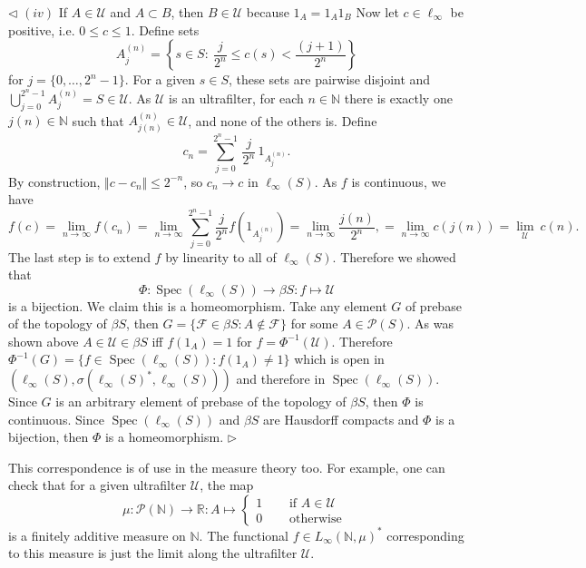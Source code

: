 \documentclass[12pt]{article}
\newenvironment{proof}{\par $\triangleleft$}{$\triangleright$}
\begin{document}
\begin{proof}
    $(iv)$ If $A\in\mathcal U$ and $A\subset B$, then $B\in\mathcal U$ because
    $1_A=1_A 1_B$
    \newline
    Now let $c\in\ell_\infty$ be positive, i.e. $0\leq c\leq 1$. Define sets
    $$
        A_j^{(n)}=\left \{s\in S:
        \ \frac{j}{2^n}\leq c(s)<\frac{(j+1)}{2^n}\right \}
    $$
    for $j=\{0,\ldots,2^n-1\}$. For a given $s\in S$, these sets are pairwise
    disjoint and $\bigcup_{j=0}^{2^n-1}A_j^{(n)}=S\in\mathcal{U}$. As
    $\mathcal{U}$ is an ultrafilter, for each $n\in\mathbb{N}$ there is exactly
    one $j(n)\in\mathbb{N}$ such that $A_{j(n)}^{(n)}\in\mathcal U$, and none of
    the others is. Define
    $$
        c_n=\sum_{j=0}^{2^n-1}\,\frac{j}{2^n}\,1_{A_j^{(n)}}.
    $$
    By construction, $\Vert c-c_n\Vert\leq 2^{-n}$, so $c_n\to c$ in
    $\ell_\infty(S)$. As $f$ is continuous, we have
    $$
        f(c)
        =\lim_{n\to\infty} f(c_n)
        =\lim_{n\to\infty}\sum_{j=0}^{2^n-1}\frac{j}{2^n}f(1_{A_j^{(n)}})
        =\lim_{n\to\infty}\frac{j(n)}{2^n},
        =\lim_{n\to\infty} c(j(n))
        =\lim_{\mathcal U}\ c(n).
    $$
    The last step is to extend $f$ by linearity to all of $\ell_\infty(S)$.
    Therefore we showed that
    $$
        \Phi:\operatorname{Spec}(\ell_\infty(S))\to \beta S:f\mapsto \mathcal{U}
    $$
    is a bijection. We claim this is a homeomorphism. Take any element $G$ of
    prebase of the topology of $\beta S$, then $G=\{\mathcal{F}\in\beta S:
        A\notin\mathcal{F}\}$ for some $A\in\mathcal{P}(S)$. As was shown above
    $A\in\mathcal{U}\in\beta S$ iff $f(1_A)=1$ for $f=\Phi^{-1}(\mathcal{U})$.
    Therefore $\Phi^{-1}(G)=\{f\in\operatorname{Spec}(\ell_\infty(S)):
        f(1_A)\neq 1\}$ which is open in
    $({\ell}_\infty(S),\sigma({\ell_\infty(S)}^*,\ell_\infty(S)))$ and therefore
    in $\operatorname{Spec}(\ell_\infty(S))$. Since $G$ is an arbitrary element
    of prebase of the topology of $\beta S$, then $\Phi$ is continuous. Since
    $\operatorname{Spec}(\ell_\infty(S))$ and $\beta S$ are Hausdorff compacts
    and $\Phi$ is a bijection, then $\Phi$ is a homeomorphism.
\end{proof}

This correspondence is of use in the measure theory too. For example, one can
check that for a given ultrafilter $\mathcal{U}$, the map
$$
    \mu:\mathcal{P}(\mathbb{N})\to\mathbb{R}:A\mapsto
    \begin{cases} 1
         & \quad\mbox{ if } A\in\mathcal{U} \\ 0&\quad\mbox{ otherwise }
    \end{cases}
$$
is a finitely additive measure on $\mathbb{N}$. The functional $f\in
    {L_\infty(\mathbb{N}, \mu)}^*$ corresponding to this measure is just the
limit along the ultrafilter $\mathcal{U}$.
\end{document}
